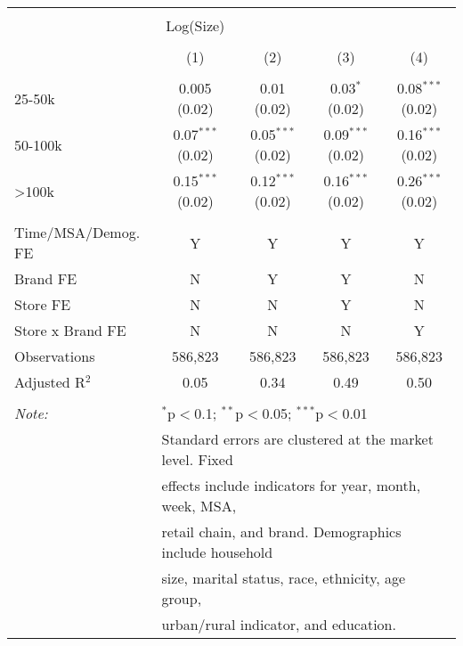 
\begin{table}[!htbp] \centering 
  \caption{} 
  \label{tab:packageSizeFull8444} 
\begin{tabular}{@{\extracolsep{5pt}}lcccc} 
\\[-1.8ex]\hline 
\hline \\[-1.8ex] 
 & Log(Size) &  &  &  \\ 
\\[-1.8ex] & (1) & (2) & (3) & (4)\\ 
\hline \\[-1.8ex] 
 25-50k & 0.005 (0.02) & 0.01 (0.02) & 0.03$^{*}$ (0.02) & 0.08$^{***}$ (0.02) \\ 
  50-100k & 0.07$^{***}$ (0.02) & 0.05$^{***}$ (0.02) & 0.09$^{***}$ (0.02) & 0.16$^{***}$ (0.02) \\ 
  >100k & 0.15$^{***}$ (0.02) & 0.12$^{***}$ (0.02) & 0.16$^{***}$ (0.02) & 0.26$^{***}$ (0.02) \\ 
 \hline \\[-1.8ex] 
Time/MSA/Demog. FE & Y & Y & Y & Y \\ 
Brand FE & N & Y & Y & N \\ 
Store FE & N & N & Y & N \\ 
Store x Brand FE & N & N & N & Y \\ 
Observations & 586,823 & 586,823 & 586,823 & 586,823 \\ 
Adjusted R$^{2}$ & 0.05 & 0.34 & 0.49 & 0.50 \\ 
\hline 
\hline \\[-1.8ex] 
\textit{Note:}  & \multicolumn{4}{l}{$^{*}$p$<$0.1; $^{**}$p$<$0.05; $^{***}$p$<$0.01} \\ 
 & \multicolumn{4}{l}{Standard errors are clustered at the market level. Fixed } \\ 
 & \multicolumn{4}{l}{effects include indicators for year, month, week, MSA, } \\ 
 & \multicolumn{4}{l}{retail chain, and brand. Demographics include household } \\ 
 & \multicolumn{4}{l}{size, marital status, race, ethnicity, age group, } \\ 
 & \multicolumn{4}{l}{urban/rural indicator, and education.} \\ 
\end{tabular} 
\end{table} 

